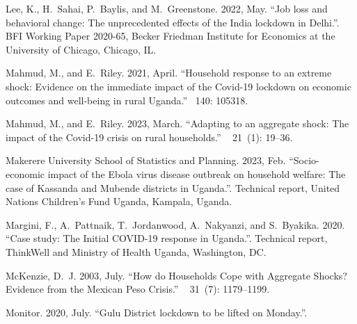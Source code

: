 \documentclass{wber}
\begin{document}
\begin{thebibliography}{}
Lee, K., H.~Sahai, P.~Baylis, and M.~Greenstone. 2022, May.
\newblock ``Job loss and behavioral change: The unprecedented effects of the
  {India} lockdown in {Delhi}.''.
\newblock BFI Working Paper 2020-65, Becker Friedman Institute for Economics at
  the University of Chicago, Chicago, IL.

Mahmud, M., and E.~Riley. 2021, April.
\newblock ``Household response to an extreme shock: {Evidence} on the immediate
  impact of the {Covid}-19 lockdown on economic outcomes and well-being in
  rural {Uganda}.''
~{140}: 105318.

Mahmud, M., and E.~Riley. 2023, March.
\newblock ``Adapting to an aggregate shock: {The} impact of the {Covid}-19
  crisis on rural households.''
~{ 21\/}~(1): 19--36.

{Makerere University School of Statistics and Planning}. 2023, Feb.
\newblock ``Socio-economic impact of the {Ebola} virus disease outbreak on
  household welfare: The case of {Kassanda} and {Mubende} districts in
  {Uganda}.''.
\newblock Technical report, United Nations Children's Fund Uganda, Kampala,
  Uganda.

Margini, F., A.~Pattnaik, T.~Jordanwood, A.~Nakyanzi, and S.~Byakika. 2020.
\newblock ``Case study: {The} {Initial} {COVID}-19 response in {Uganda}.''.
\newblock Technical report, ThinkWell and Ministry of Health Uganda,
  Washington, DC.

McKenzie, D.~J. 2003, July.
\newblock ``How do {Households} {Cope} with {Aggregate} {Shocks}? {Evidence}
  from the {Mexican} {Peso} {Crisis}.''
~{ 31\/}~(7):
  1179--1199.

Monitor. 2020, July.
\newblock ``Gulu {District} lockdown to be lifted on {Monday}.''.


\end{thebibliography}
\end{document}
